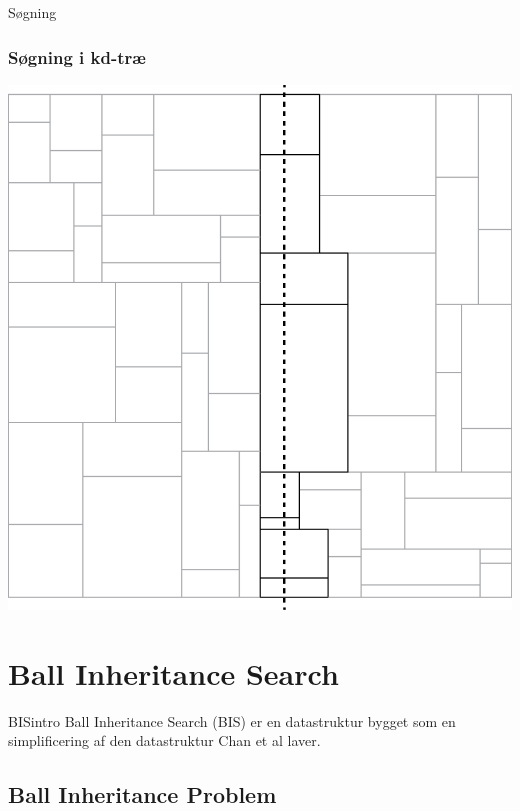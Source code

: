 \documentclass[pdf]{beamer}
\begin{document}
\begin{frame}{Søgning}
  \frametitle{Søgning i kd-træ}
  \begin{center}
    \includegraphics[scale=0.75]{pictures/kd_bound2.png}
  \end{center}
\end{frame}



\section{Ball Inheritance Search}
\begin{frame}{BISintro}
  Ball Inheritance Search (BIS) er en datastruktur bygget som en simplificering af den datastruktur Chan et al laver.

\end{frame}


\subsection{Ball Inheritance Problem}
\end{document}
